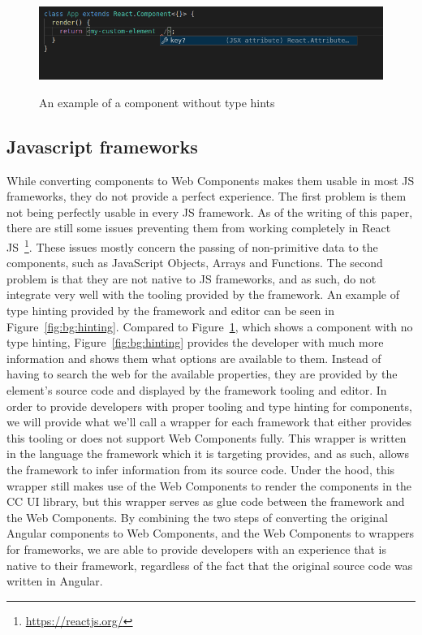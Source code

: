 \begin{figure}[h]
	\caption{An example of a component without type hints}
	\includegraphics[width=\columnwidth]{figures/background/no-hinting.png}
	\label{fig:bg:no-hinting}
	\centering
\end{figure}

\subsection{Javascript frameworks}\label{sec:bg:jsframeworks}
While converting components to Web Components makes them usable in most JS frameworks, they do not provide a perfect experience. The first problem is them not being perfectly usable in every JS framework. As of the writing of this paper, there are still some issues preventing them from working completely in React JS~\footnote{\url{https://reactjs.org/}}. These issues mostly concern the passing of non-primitive data to the components, such as JavaScript Objects, Arrays and Functions. The second problem is that they are not native to JS frameworks, and as such, do not integrate very well with the tooling provided by the framework. An example of type hinting provided by the framework and editor can be seen in Figure~\ref{fig:bg:hinting}. Compared to Figure~\ref{fig:bg:no-hinting}, which shows a component with no type hinting, Figure~\ref{fig:bg:hinting} provides the developer with much more information and shows them what options are available to them. Instead of having to search the web for the available properties, they are provided by the element's source code and displayed by the framework tooling and editor. In order to provide developers with proper tooling and type hinting for components, we will provide what we'll call a wrapper for each framework that either provides this tooling or does not support Web Components fully. This wrapper is written in the language the framework which it is targeting provides, and as such, allows the framework to infer information from its source code. Under the hood, this wrapper still makes use of the Web Components to render the components in the CC UI library, but this wrapper serves as glue code between the framework and the Web Components. By combining the two steps of converting the original Angular components to Web Components, and the Web Components to wrappers for frameworks, we are able to provide developers with an experience that is native to their framework, regardless of the fact that the original source code was written in Angular.